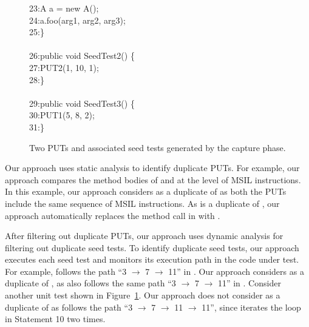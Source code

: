 \begin{figure}[t]
\begin{CodeOut}
23:\hspace*{0.2in}A a = new A();\\
24:\hspace*{0.2in}a.foo(arg1, arg2, arg3);\\
25:\}\\
\\
26:public void SeedTest2() \{\\
27:\hspace*{0.2in}PUT2(1, 10, 1);\\
28:\}\\
\\
29:public void SeedTest3() \{\\
30:\hspace*{0.2in}PUT1(5, 8, 2);\\
31:\}\\
\end{CodeOut}\vspace*{-2ex}
\caption{\label{fig:samplePutAndUT}Two PUTs and associated seed tests generated by the capture phase.}\vspace*{-2ex}
\end{figure}

Our approach uses static analysis to identify duplicate PUTs. For example, our approach compares the method bodies of  and  at the level of MSIL instructions. In this example, our approach considers  as a duplicate of  as both the PUTs include the same sequence of MSIL instructions. As  is a duplicate of , our approach automatically replaces the  method call in  with .

After filtering out duplicate PUTs, our approach uses dynamic analysis for filtering out duplicate seed tests. To identify duplicate seed tests, our approach executes each seed test and monitors its execution path in the code under test. For example,  follows the path ``3 $\rightarrow$ 7 $\rightarrow$ 11'' in . Our approach considers  as a duplicate of , as  also follows the same path ``3 $\rightarrow$ 7 $\rightarrow$ 11'' in . Consider another unit test  shown in Figure~\ref{fig:samplePutAndUT}. Our approach does not consider  as a duplicate of  as  follows the path ``3 $\rightarrow$ 7 $\rightarrow$ 11 $\rightarrow$ 11'', since  iterates the loop in Statement 10 two times.

